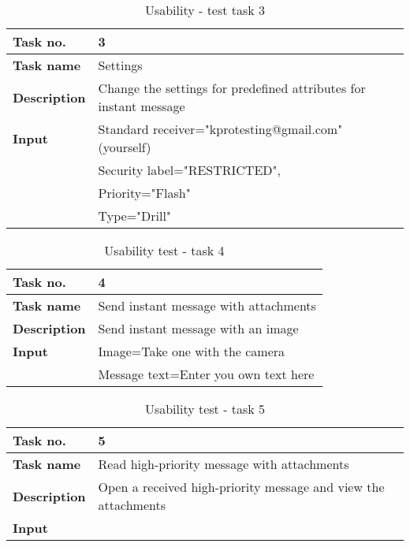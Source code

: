 		\begin{table}
\begin{center}
			\begin{tabular}{>{\bfseries}l|l}\hline
				Task no.&3\\ \hline
				Task name&Settings\\ \hline
				Description&Change the settings for predefined attributes for instant message\\ \hline
				Input&Standard receiver="kprotesting@gmail.com" (yourself)\\
					& Security label="RESTRICTED",\\
					&Priority="Flash"\\
					& Type="Drill"\\ \hline
			\end{tabular}
\end{center}
			\caption{Usability - test task 3} \label{tab:usabilitytask3}
		\end{table}
		\begin{table}
\begin{center}
			\begin{tabular}{>{\bfseries}l|l}\hline
				Task no.&4\\ \hline
				Task name&Send instant message with attachments\\ \hline
				Description&Send instant message with an image\\ \hline
				Input &Image=Take one with the camera\\
					&Message text=Enter you own text here\\ \hline
			\end{tabular}
\end{center}
			\caption{Usability test - task 4} \label{tab:usabilitytask4}
		\end{table}
		\begin{table}
\begin{center}
			\begin{tabular}{>{\bfseries}l|l}\hline
				Task no.&5\\ \hline
				Task name&Read high-priority message with attachments\\ \hline
				Description&Open a received high-priority message and view the attachments\\ \hline
				Input&\\ \hline
			\end{tabular}
\end{center}
			\caption{Usability test - task 5} \label{tab:usabilitytask5}
		\end{table}
